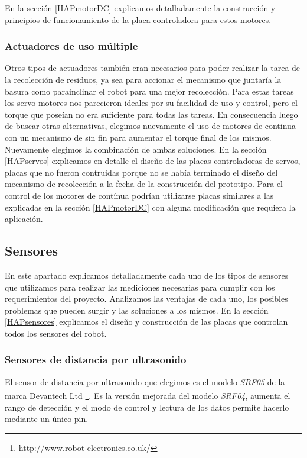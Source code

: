 En la secci\'on \ref{HAPmotorDC} explicamos detalladamente la construcci\'on y principios de funcionamiento de la placa controladora para estos motores.

\subsubsection{Actuadores de uso m\'ultiple}
\label{HactuadoresVarios}

Otros tipos de actuadores tambi\'en eran necesarios para poder realizar la tarea de la recolecci\'on de residuos, ya sea para accionar el mecanismo
que juntar\'ia la basura como parainclinar el robot para una mejor recolecci\'on.
Para estas tareas los servo motores nos parecieron ideales por su facilidad de uso y control, pero el torque que pose\'ian no era suficiente para todas las tareas.
En consecuencia luego de buscar otras alternativas, elegimos nuevamente el uso de motores de continua con un mecanismo de sin fin para aumentar el
torque final de los mismos. Nuevamente elegimos la combinaci\'on de ambas soluciones. En la secci\'on \ref{HAPservos} explicamos en detalle
el dise\~no de las placas controladoras de servos, placas que no fueron contruidas porque no se hab\'ia terminado el dise\~no del mecanismo de
recolecci\'on a la fecha de la construcci\'on del prototipo. Para el control de los motores de cont\'inua podr\'ian utilizarse placas similares a las
explicadas en la secci\'on \ref{HAPmotorDC} con alguna modificaci\'on que requiera la aplicaci\'on.

\subsection{Sensores}
\label{Hsensores}

En este apartado explicamos detalladamente cada uno de los tipos de sensores que utilizamos para realizar las mediciones necesarias para cumplir
con los requerimientos del proyecto. Analizamos las ventajas de cada uno, los posibles problemas que pueden surgir y las soluciones a los mismos.
En la secci\'on \ref{HAPsensores} explicamos el dise\~no y construcci\'on de las placas que controlan todos los sensores del robot.

\subsubsection{Sensores de distancia por ultrasonido}
\label{HSultrasonido}

El sensor de distancia por ultrasonido que elegimos es el modelo \emph{SRF05} de la marca Devantech Ltd \footnote{http://www.robot-electronics.co.uk/}.
Es la versi\'on mejorada del modelo \emph{SRF04}, aumenta el rango de detecci\'on y el modo de control y lectura de los datos permite hacerlo mediante un
\'unico pin.

